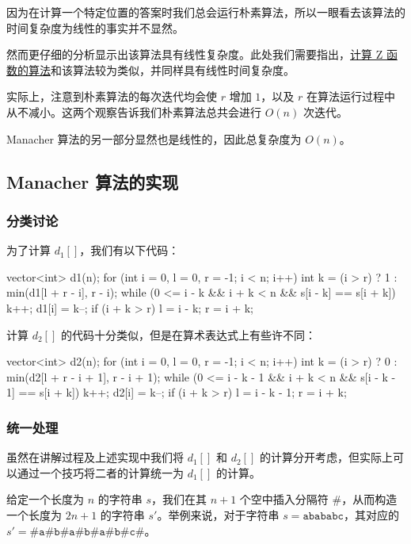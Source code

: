 因为在计算一个特定位置的答案时我们总会运行朴素算法，所以一眼看去该算法的时间复杂度为线性的事实并不显然。

然而更仔细的分析显示出该算法具有线性复杂度。此处我们需要指出，\href{z-function.md}{计算 Z 函数的算法}和该算法较为类似，并同样具有线性时间复杂度。

实际上，注意到朴素算法的每次迭代均会使 $r$ 增加 $1$，以及 $r$ 在算法运行过程中从不减小。这两个观察告诉我们朴素算法总共会进行 $O(n)$ 次迭代。

Manacher 算法的另一部分显然也是线性的，因此总复杂度为 $O(n)$。

\subsection{Manacher 算法的实现}

\subsubsection{分类讨论}

为了计算 $d_1[]$，我们有以下代码：

\begin{cppcode}
vector<int> d1(n);
for (int i = 0, l = 0, r = -1; i < n; i++) {
  int k = (i > r) ? 1 : min(d1[l + r - i], r - i);
  while (0 <= i - k && i + k < n && s[i - k] == s[i + k]) {
    k++;
  }
  d1[i] = k--;
  if (i + k > r) {
    l = i - k;
    r = i + k;
  }
}
\end{cppcode}

计算 $d_2[]$ 的代码十分类似，但是在算术表达式上有些许不同：

\begin{cppcode}
vector<int> d2(n);
for (int i = 0, l = 0, r = -1; i < n; i++) {
  int k = (i > r) ? 0 : min(d2[l + r - i + 1], r - i + 1);
  while (0 <= i - k - 1 && i + k < n && s[i - k - 1] == s[i + k]) {
    k++;
  }
  d2[i] = k--;
  if (i + k > r) {
    l = i - k - 1;
    r = i + k;
  }
}
\end{cppcode}

\subsubsection{统一处理}

虽然在讲解过程及上述实现中我们将 $d_1[]$ 和 $d_2[]$ 的计算分开考虑，但实际上可以通过一个技巧将二者的计算统一为 $d_1[]$ 的计算。

给定一个长度为 $n$ 的字符串 $s$，我们在其 $n + 1$ 个空中插入分隔符 $\#$，从而构造一个长度为 $2n + 1$ 的字符串 $s'$。举例来说，对于字符串 $s = \mathtt{abababc}$，其对应的 $s' = \mathtt{\#a\#b\#a\#b\#a\#b\#c\#}$。

